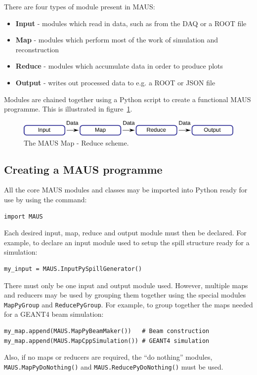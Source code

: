 \documentclass[a4paper,10pt]{article}
\begin{document}
    There are four types of module present in MAUS:
    \begin{itemize}
      \item \textbf{Input} - modules which read in data, such as from the DAQ or a ROOT file
      \item \textbf{Map} - modules which perform most of the work of simulation and reconstruction
      \item \textbf{Reduce} - modules which accumulate data in order to produce plots
      \item \textbf{Output} - writes out processed data to e.g. a ROOT or JSON file 
    \end{itemize}
    \noindent
    Modules are chained together using a Python script to create a functional MAUS programme.  This is illustrated in figure~\ref{fig:MapReduce}.
    
    \begin{figure}[h]
      \begin{center}
        \includegraphics[width=0.8\linewidth]{./graphics/map-reduce.pdf}
        \caption{The MAUS Map - Reduce scheme.}
        \label{fig:MapReduce}
      \end{center}
    \end{figure}

  \subsection{Creating a MAUS programme}
    All the core MAUS modules and classes may be imported into Python ready for use by using the command:
\lstset{language=Python} 
    \begin{lstlisting}
import MAUS
    \end{lstlisting}
    Each desired input, map, reduce and output module must then be declared.  For example, to declare an input module used to setup the spill structure ready for a simulation:
    \begin{lstlisting}
my_input = MAUS.InputPySpillGenerator()
    \end{lstlisting}
    There must only be one input and output module used.  However, multiple maps and reducers may be used by grouping them together using the special modules \texttt{MapPyGroup} and \texttt{ReducePyGroup}. For example, to group together the maps needed for a GEANT4 beam simulation:
    \begin{lstlisting}
my_map.append(MAUS.MapPyBeamMaker())   # Beam construction
my_map.append(MAUS.MapCppSimulation()) # GEANT4 simulation
    \end{lstlisting}
    Also, if no maps or reducers are required, the ``do nothing'' modules, \texttt{MAUS.MapPyDoNothing()} and \texttt{MAUS.ReducePyDoNothing()} must be used.
\end{document}
